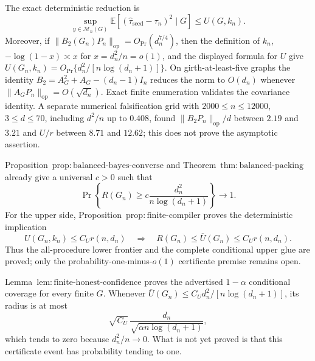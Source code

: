 The exact deterministic reduction is
\[
\sup_{y\in\mathcal M_n(G)}\mathbb E[(\widehat\tau_{\mathrm{seed}}-\tau_n)^2\mid G]
\le U(G,k_n).
\]
Moreover, if \(\|B_2(G_n)P_n\|_{\mathrm{op}}=O_{\Pr}(d_n^{7/4})\), then the definition of \(k_n\), \(-\log(1-x)\asymp x\) for \(x=d_n^2/n=o(1)\), and the displayed formula for \(U\) give \(U(G_n,k_n)=O_{\Pr}\{d_n^2/[n\log(d_n+1)]\}\).  On girth-at-least-five graphs the identity \(B_2=A_G^2+A_G-(d_n-1)I_n\) reduces the norm to \(O(d_n)\) whenever \(\|A_GP_n\|_{\mathrm{op}}=O(\sqrt{d_n})\).  Exact finite enumeration validates the covariance identity.  A separate numerical falsification grid with \(2000\le n\le12000\), \(3\le d\le70\), including \(d^2/n\) up to \(0.408\), found \(\|B_2P_n\|_{\mathrm{op}}/d\) between \(2.19\) and \(3.21\) and \(U/r\) between \(8.71\) and \(12.62\); this does not prove the asymptotic assertion.

Proposition~\(\mathrm{prop{:}balanced\mbox{-}bayes\mbox{-}converse}\) and Theorem~\(\mathrm{thm{:}balanced\mbox{-}packing}\) already give a universal \(c>0\) such that
\[
\Pr\!\left\{R(G_n)\ge c\frac{d_n^2}{n\log(d_n+1)}\right\}\longrightarrow1.
\]
For the upper side, Proposition~\(\mathrm{prop{:}finite\mbox{-}compiler}\) proves the deterministic implication
\[
U(G_n,k_n)\le C_Ur(n,d_n)
\quad\Longrightarrow\quad
R(G_n)\le\overline U(G_n)\le C_Ur(n,d_n).
\]
Thus the all-procedure lower frontier and the complete conditional upper glue are proved; only the probability-one-minus-\(o(1)\) certificate premise remains open.

Lemma~\(\mathrm{lem{:}finite\mbox{-}honest\mbox{-}confidence}\) proves the advertised \(1-\alpha\) conditional coverage for every finite \(G\).  Whenever \(\overline U(G_n)\le C_Ud_n^2/[n\log(d_n+1)]\), its radius is at most
\[
\sqrt{C_U}\,\frac{d_n}{\sqrt{\alpha n\log(d_n+1)}},
\]
which tends to zero because \(d_n^2/n\to0\).  What is not yet proved is that this certificate event has probability tending to one.
